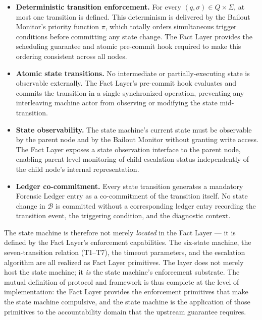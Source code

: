 \begin{itemize}\itemsep=0pt
\item[(\textit{i})] \textbf{Deterministic transition enforcement.} For every $(q, \sigma) \in Q \times \Sigma$, at most one transition is defined. This determinism is delivered by the Bailout Monitor's priority function $\pi$, which totally orders simultaneous trigger conditions before committing any state change. The Fact Layer provides the scheduling guarantee and atomic pre-commit hook required to make this ordering consistent across all nodes.

\item[(\textit{ii})] \textbf{Atomic state transitions.} No intermediate or partially-executing state is observable externally. The Fact Layer's pre-commit hook evaluates and commits the transition in a single synchronized operation, preventing any interleaving machine actor from observing or modifying the state mid-transition.

\item[(\textit{iii})] \textbf{State observability.} The state machine's current state must be observable by the parent node and by the Bailout Monitor without granting write access. The Fact Layer exposes a state observation interface to the parent node, enabling parent-level monitoring of child escalation status independently of the child node's internal representation.

\item[(\textit{iv})] \textbf{Ledger co-commitment.} Every state transition generates a mandatory Forensic Ledger entry as a co-commitment of the transition itself. No state change in $\mathcal{B}$ is committed without a corresponding ledger entry recording the transition event, the triggering condition, and the diagnostic context.
\end{itemize}

The state machine is therefore not merely \emph{located} in the Fact Layer — it is defined by the Fact Layer's enforcement capabilities. The six-state machine, the seven-transition relation (T1–T7), the timeout parameters, and the escalation algorithm are all realized as Fact Layer primitives. The \fact{} layer does not merely host the state machine; it \emph{is} the state machine's enforcement substrate. The mutual definition of protocol and framework is thus complete at the level of implementation: the Fact Layer provides the enforcement primitives that make the state machine compulsive, and the state machine is the application of those primitives to the accountability domain that the upstream guarantee requires.

